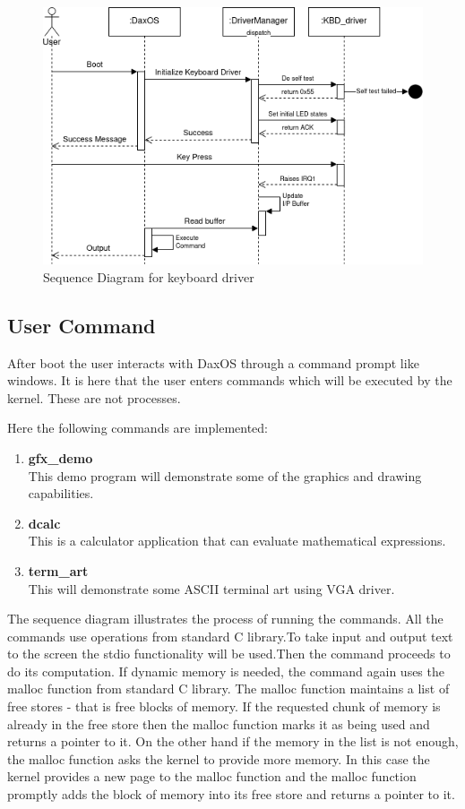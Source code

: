 \begin{figure}[h!]
	\includegraphics[width=\textwidth,height=\textheight,keepaspectratio]{kbd_driver}
	\caption{Sequence Diagram for keyboard driver}
\end{figure}
\pagebreak


\subsection{User Command}
\begin{flushleft}
	After boot the user interacts with DaxOS through a command prompt like windows. It
	is here that the user enters commands which will be executed by the kernel. These
	are not processes.
	
	Here the following commands are implemented:
	\begin{enumerate}
	\item \textbf{gfx\_demo}\\
	This demo program will demonstrate some of the graphics and drawing capabilities.
	\item \textbf{dcalc}\\
	This is a calculator application that can evaluate mathematical expressions.
	\item \textbf{term\_art}\\
	This will demonstrate some ASCII terminal art using VGA driver.
	\end{enumerate}

	The sequence diagram illustrates the process of running the commands. All the
	commands use operations from standard C library.To take input and output text to
	the screen the stdio functionality will be used.Then the command proceeds to do its
	computation. If dynamic memory is needed, the command again uses the malloc
	function from standard C library. The malloc function maintains a list of free stores -
	that is free blocks of memory. If the requested chunk of memory is already in the free
	store then the malloc function marks it as being used and returns a pointer to it. On
	the other hand if the memory in the list is not enough, the malloc function asks the
	kernel to provide more memory. In this case the kernel provides a new page
	to the malloc function and the malloc function promptly adds the block of memory
	into its free store and returns a pointer to it.
	
\end{flushleft}

